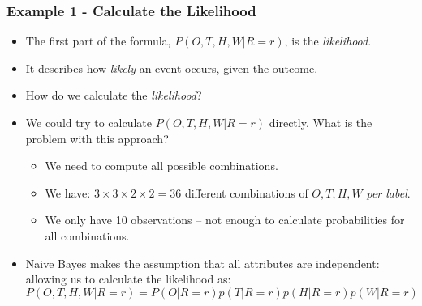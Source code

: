 \documentclass[aspectratio=169, 10pt]{beamer}
\begin{document}
\begin{frame}[t]
    \frametitle{Example 1 - Calculate the Likelihood}
    \begin{itemize}
        \item The first part of the formula, $P(O,T,H,W|R=r)$, is the \textit{likelihood}.
        \item It describes how \textit{likely} an event occurs, given the outcome.
        \item How do we calculate the \textit{likelihood}?
        \pause
        \item We could try to calculate $P(O,T,H,W|R=r)$ directly. What is the problem with this approach?
            \begin{itemize}
                \item We need to compute all possible combinations.
                \item We have: $3\times3\times2\times2 = 36$ different combinations of $O,T,H,W$ \textit{per label}.
                \item We only have 10 observations -- not enough to calculate probabilities for all combinations.
            \end{itemize}
        \item Naive Bayes makes the assumption that all attributes are independent: allowing us to calculate the likelihood as:
            \[
                P(O,T,H,W|R=r) = P(O|R=r)p(T|R=r)p(H|R=r)p(W|R=r)
            \]    
    \end{itemize}
\end{frame}
\end{document}
